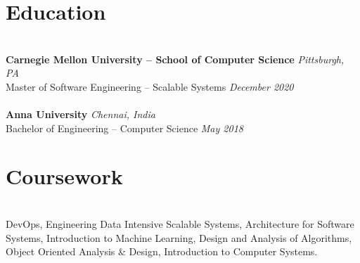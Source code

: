 \documentclass{resume}
\author{https://aravindvasu.dev}{Aravind Vasudevan}
\begin{document}
\maketitle
\section*{Education}
\titlerule
\noindent
\\
\textbf{Carnegie Mellon University -- School of Computer Science} \hfill \textit{Pittsburgh, PA} \\
{\small Master of Software Engineering -- Scalable Systems} \hfill \textit{\small December 2020}\\
\\
\textbf{Anna University} \hfill \textit{Chennai, India} \\
{\small Bachelor of Engineering -- Computer Science} \hfill \textit{\small May 2018}

\section*{Coursework}
\titlerule
\noindent
\\
DevOps, Engineering Data Intensive Scalable Systems, Architecture for Software Systems, Introduction to Machine Learning, Design and Analysis of Algorithms, Object Oriented Analysis \& Design, Introduction to Computer Systems.
\end{document}
